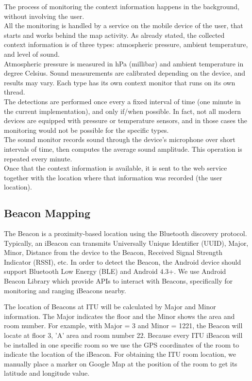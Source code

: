 \documentclass{sigchi}
\begin{document}
The process of monitoring the context information happens in the background, without involving the user. \\
All the monitoring is handled by a service on the mobile device of the user, that starts and works behind the map activity.
As already stated, the collected context information is of three types: atmospheric pressure, ambient temperature, and level of sound. \\
Atmospheric pressure is measured in hPa (millibar) and ambient temperature in degree Celsius.
Sound measurements are calibrated depending on the device, and results may vary.
Each type has its own context monitor that runs on its own thread. \\
The detections are performed once every a fixed interval of time (one minute in the current implementation), and only if/when possible. In fact, not all modern devices are equipped with pressure or temperature sensors, and in those cases the monitoring would not be possible for the specific types.\\
The sound monitor records sound through the device's microphone over short intervals of time, then computes the average sound amplitude. This operation is repeated every minute. \\
Once that the context information is available, it is sent to the web service together with the location where that information was recorded (the user location).

\subsection{Beacon Mapping}
The Beacon is a proximity-based location using the Bluetooth discovery protocol.
Typically, an iBeacon can transmits Universally Unique Identifier (UUID), Major, Minor, Distance from the device to the Beacon, Received Signal Strength Indicator (RSSI), etc.
In order to detect the Beacon, the Android device should support Bluetooth Low Energy (BLE) and Android 4.3+.
We use Android Beacon Library which provide APIs to interact with Beacons, specifically for monitoring and ranging iBeacons nearby.

The location of Beacons at ITU will be calculated by Major and Minor information.
The Major indicates the floor and the Minor shows the area and room number.
For example, with Major = 3 and Minor = 1221, the Beacon will locate at floor 3, 'A' area and room number 22.
Because every ITU iBeacon will be installed in one specific room so we use the GPS coordinates of the room to indicate the location of the iBeacon.
For obtaining the ITU room location, we manually place a marker on Google Map at the position of the room to get its latitude and longitude value. 
\end{document}
